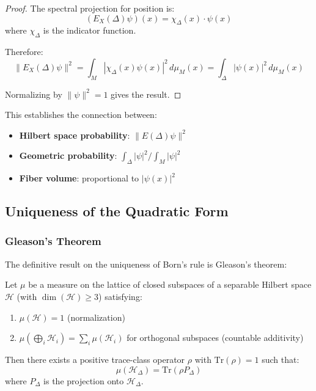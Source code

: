 \begin{proof}
The spectral projection for position is:
\begin{equation}
    (E_X(\Delta)\psi)(x) = \chi_\Delta(x) \cdot \psi(x)
\end{equation}
where $\chi_\Delta$ is the indicator function.

Therefore:
\begin{equation}
    \|E_X(\Delta)\psi\|^2 = \int_M |\chi_\Delta(x) \psi(x)|^2 \, d\mu_M(x) = \int_\Delta |\psi(x)|^2 \, d\mu_M(x)
\end{equation}

Normalizing by $\|\psi\|^2 = 1$ gives the result.
\end{proof}

This establishes the connection between:
\begin{itemize}
    \item \textbf{Hilbert space probability}: $\|E(\Delta)\psi\|^2$
    \item \textbf{Geometric probability}: $\int_\Delta |\psi|^2 / \int_M |\psi|^2$
    \item \textbf{Fiber volume}: proportional to $|\psi(x)|^2$
\end{itemize}

\subsection{Uniqueness of the Quadratic Form}

\subsubsection{Gleason's Theorem}

The definitive result on the uniqueness of Born's rule is Gleason's theorem:

\begin{theorem}
Let $\mu$ be a measure on the lattice of closed subspaces of a separable Hilbert space $\mathcal{H}$ (with $\dim(\mathcal{H}) \geq 3$) satisfying:
\begin{enumerate}
    \item $\mu(\mathcal{H}) = 1$ (normalization)
    \item $\mu(\bigoplus_i \mathcal{H}_i) = \sum_i \mu(\mathcal{H}_i)$ for orthogonal subspaces (countable additivity)
\end{enumerate}
Then there exists a positive trace-class operator $\rho$ with $\text{Tr}(\rho) = 1$ such that:
\begin{equation}
    \mu(\mathcal{H}_\Delta) = \text{Tr}(\rho P_\Delta)
\end{equation}
where $P_\Delta$ is the projection onto $\mathcal{H}_\Delta$.
\end{theorem}

